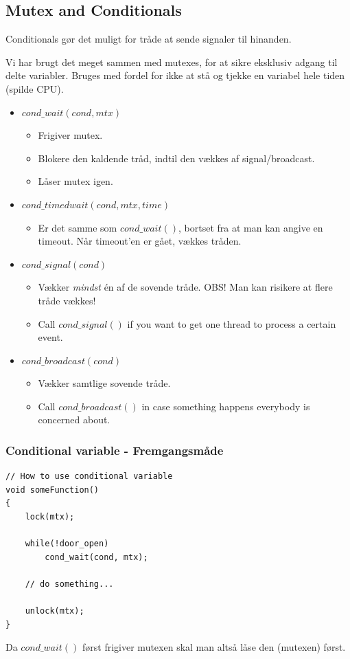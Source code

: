 \subsection{Mutex and Conditionals}
Conditionals gør det muligt for tråde at sende signaler til hinanden.

Vi har brugt det meget sammen med mutexes, for at sikre eksklusiv adgang til delte variabler. Bruges med fordel for ikke at stå og tjekke en variabel hele tiden (spilde CPU).

\begin{itemize}
	\item $cond\_wait(cond, mtx)$
	\begin{itemize}
		\item Frigiver mutex.
		\item Blokere den kaldende tråd, indtil den vækkes af signal/broadcast.
		\item Låser mutex igen.
	\end{itemize}
	\item $cond\_timedwait(cond, mtx, time)$
	\begin{itemize}
		\item Er det samme som $cond\_wait()$, bortset fra at man kan angive en timeout. Når timeout'en er gået, vækkes tråden.
	\end{itemize}
	\item $cond\_signal(cond)$
	\begin{itemize}
		\item Vækker \textit{mindst} én af de sovende tråde. OBS! Man kan risikere at flere tråde vækkes!
		\item Call $cond\_signal()$ if you want to get one thread to process a certain event.
	\end{itemize}
	\item $cond\_broadcast(cond)$
	\begin{itemize}
		\item Vækker samtlige sovende tråde.
		\item Call $cond\_broadcast()$ in case something happens everybody is concerned about.
	\end{itemize}
\end{itemize}

\subsubsection{Conditional variable - Fremgangsmåde}

\begin{lstlisting}[otherkeywords={lock, unlock}]
// How to use conditional variable
void someFunction()
{
	lock(mtx);
	
	while(!door_open)
		cond_wait(cond, mtx);
		
	// do something...
	
	unlock(mtx);
}
\end{lstlisting}
Da $cond\_wait()$ først frigiver mutexen skal man altså låse den (mutexen) først.\\

